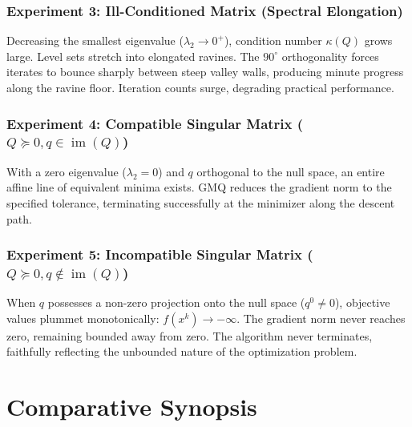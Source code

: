 \subsubsection{Experiment 3: Ill-Conditioned Matrix (Spectral Elongation)}
Decreasing the smallest eigenvalue ($\lambda_2 \to 0^+$), condition number $\kappa(Q)$ grows large. Level sets stretch into elongated ravines.
The $90^\circ$ orthogonality forces iterates to bounce sharply between steep valley walls, producing minute progress along the ravine floor. Iteration counts surge, degrading practical performance.

\subsubsection{Experiment 4: Compatible Singular Matrix ($Q \succeq 0, q \in \operatorname{im}(Q)$)}
With a zero eigenvalue ($\lambda_2 = 0$) and $q$ orthogonal to the null space, an entire affine line of equivalent minima exists. GMQ reduces the gradient norm to the specified tolerance, terminating successfully at the minimizer along the descent path.

\subsubsection{Experiment 5: Incompatible Singular Matrix ($Q \succeq 0, q \notin \operatorname{im}(Q)$)}
When $q$ possesses a non-zero projection onto the null space ($q^0 \neq 0$), objective values plummet monotonically: $f(x^k) \to -\infty$. The gradient norm never reaches zero, remaining bounded away from zero. The algorithm never terminates, faithfully reflecting the unbounded nature of the optimization problem.

\FloatBarrier
\section{Comparative Synopsis}
\label{sec:comparative-synopsis-quadratic-gmq}

